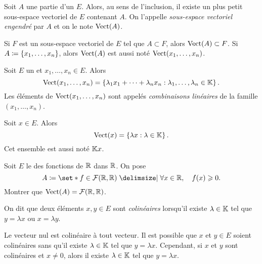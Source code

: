 \documentclass{magnoliaold}
\begin{document}
\begin{definition}[utile=-2]
Soit $A$ une partie d'un \Kev $E$. Alors, au sens de l'inclusion, il existe un plus petit
sous-espace vectoriel de $E$ contenant $A$. On l'appelle \emph{sous-espace vectoriel
engendré} par $A$ et on le note $\operatorname{Vect}(A)$.
\end{definition}

\begin{remarques}
\remarque Si $F$ est un sous-espace vectoriel de $E$ tel que $A\subset F$, alors
  $\operatorname{Vect}(A)\subset F$.
\remarque Si $A\coloneqq\left\{x_1,\ldots,x_n\right\}$, alors $\operatorname{Vect}(A)$ est aussi noté
  $\operatorname{Vect}(x_1,\ldots,x_n)$.
\end{remarques}

\begin{proposition}[utile=-2]
Soit $E$ un \Kev et $x_1,\ldots,x_n\in E$. Alors
\[\vect(x_1,\ldots,x_n)=\ensim{\lambda_1 x_1+\cdots+\lambda_n x_n}%
  {\lambda_1,\ldots,\lambda_n\in\K}.\]
Les éléments de $\operatorname{Vect}(x_1,\ldots,x_n)$ sont appelés \emph{combinaisons linéaires}
de la famille $(x_1,\ldots,x_n)$.
\end{proposition}

\begin{remarqueUnique}
\remarque Soit $x\in E$. Alors
  \[\operatorname{Vect}(x)=\left\{\lambda x : \lambda\in\mathbb{K}\right\}.\]
  Cet ensemble est aussi noté $\mathbb{K} x$.
\end{remarqueUnique}

\begin{exoUnique}
\exo Soit $E$ le \Rev des fonctions de $\mathbb{R}$ dans $\mathbb{R}$. On pose
  \[A\defeq\enstq{f\in\mathcal{F}(\R,\R)}{\forall x\in\R \qsep f(x)\geq 0}.\]
	Montrer que $\operatorname{Vect}(A)=\mathcal{F}(\mathbb{R},\mathbb{R})$.
\end{exoUnique}

\begin{definition}
  On dit que deux éléments $x,y\in E$ sont \emph{colinéaires} lorsqu'il existe
  $\lambda\in\mathbb{K}$ tel que $y=\lambda x$ ou $x=\lambda y$.
\end{definition}

\begin{remarques}
\remarque Le vecteur nul est colinéaire à tout vecteur.
\remarque Il est possible que
  $x$ et $y\in E$ soient colinéaires sans qu'il existe $\lambda\in\mathbb{K}$ tel que $y=\lambda x$.
  Cependant, si $x$ et $y$ sont colinéaires et $x\neq 0$, alors il existe $\lambda\in\mathbb{K}$
  tel que $y=\lambda x$.
\end{remarques}
\end{document}
